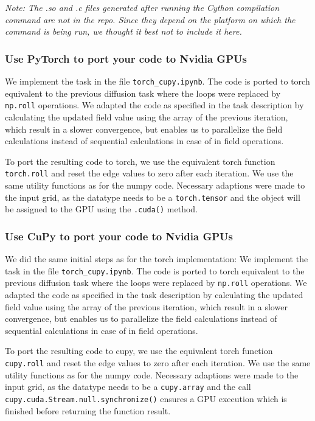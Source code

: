 \documentclass[a4paper,12pt]{article}
\begin{document}
\textit{Note: The .so and .c files generated after running the Cython compilation command are not in the repo. Since they depend on the platform on which the command is being run, we thought it best not to include it here.}

\subsubsection{Use PyTorch to port your code to Nvidia GPUs}
We implement the task in the file \verb|torch_cupy.ipynb|. The code is ported to torch equivalent to the previous diffusion task
where the loops were replaced by \verb|np.roll| operations. We adapted the code as specified in the task description by calculating the
updated field value using the array of the previous iteration, which result in a slower convergence, but enables us to parallelize the field calculations
instead of sequential calculations in case of in field operations.

To port the resulting code to torch, we use the equivalent torch function \verb|torch.roll| and reset the edge values to zero after each iteration. We use the same utility functions as for the numpy code.
Necessary adaptions were made to the input grid, as the datatype needs to be a \verb|torch.tensor| and the object will be assigned to the GPU using the \verb|.cuda()| method.

\subsubsection{Use CuPy to port your code to Nvidia GPUs}
We did the same initial steps as for the torch implementation:
We implement the task in the file \verb|torch_cupy.ipynb|. The code is ported to torch equivalent to the previous diffusion task
where the loops were replaced by \verb|np.roll| operations. We adapted the code as specified in the task description by calculating the
updated field value using the array of the previous iteration, which result in a slower convergence, but enables us to parallelize the field calculations
instead of sequential calculations in case of in field operations.

To port the resulting code to cupy, we use the equivalent torch function \verb|cupy.roll| and reset the edge values to zero after each iteration. We use the same utility functions as for the numpy code.
Necessary adaptions were made to the input grid, as the datatype needs to be a \verb|cupy.array| and the call \verb|cupy.cuda.Stream.null.synchronize()| ensures a GPU execution which is finished before returning the function result.
\end{document}
